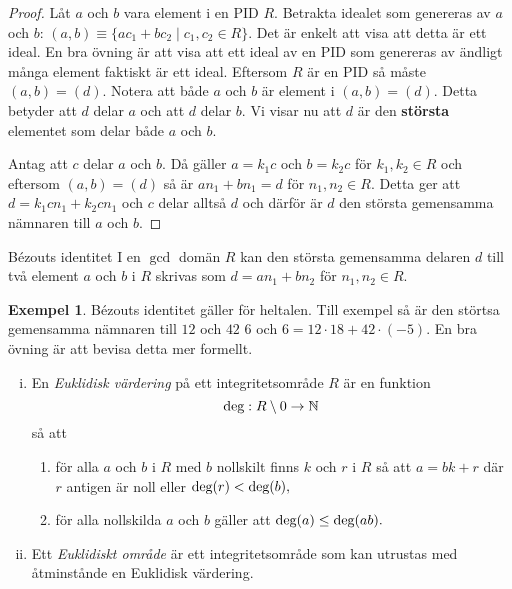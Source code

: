 \documentclass{article}
\newcommand{\grad}[0]{\textnormal{deg}}
\theoremstyle{definition}
\newtheorem{exmp}[thm]{Exempel}
\begin{document}
\begin{proof}
  Låt $a$ och $b$ vara element i en PID $R$. Betrakta idealet som genereras av $a$ och $b$: $(a, b) \equiv \{ ac_1 + bc_2 \; | \; c_1, c_2 \in R \}$.
  Det är enkelt att visa att detta är ett ideal. En bra övning är att visa att ett ideal av en PID som genereras av ändligt många element faktiskt 
  är ett ideal. Eftersom $R$ är en PID så måste $(a, b) = (d)$. Notera att både $a$ och $b$ är element i $(a, b) = (d)$. Detta betyder att 
  $d$ delar $a$ och att $d$ delar $b$. Vi visar nu att $d$ är den \textbf{största} elementet som delar både $a$ och $b$. 

  Antag att $c$ delar $a$ och $b$. Då gäller $a = k_1c$ och $b = k_2c$ för $k_1, k_2 \in R$ och eftersom $(a, b) = (d)$ så är $an_1 + bn_1 = d$
  för $n_1, n_2 \in R$. Detta ger att $d = k_1cn_1 + k_2cn_1$ och $c$ delar alltså $d$ och därför är $d$ den största gemensamma nämnaren till $a$ och $b$.
\end{proof}

\hypertarget{Bézouts identitet}{}
\begin{mykol}{Bézouts identitet}{}
  I en $\gcd$ domän $R$ kan den största gemensamma delaren $d$ till två element $a$ och $b$ i $R$ skrivas som $d = an_1 + bn_2$
  för $n_1, n_2 \in R.$
\end{mykol}
\begin{exmp}
  Bézouts identitet gäller för heltalen. Till exempel så är den störtsa gemensamma nämnaren till $12$ och $42$ $6$ och 
  $6 = 12 \cdot 18 + 42 \cdot (-5).$ En bra övning är att bevisa detta mer formellt. 
\end{exmp}

\begin{mydef}{}{}
  \begin{enumerate}[(i)]
    \item En \textit{Euklidisk värdering} på ett integritetsområde $R$ är en funktion 
    \[ \grad: R \setminus 0 \rightarrow \mathbb{N} \]
    så att 
    \begin{enumerate}
      \item för alla $a$ och $b$ i $R$ med $b$ nollskilt finns $k$ och $r$ i $R$ så att $a = bk + r$ där $r$ antigen är noll eller $\grad (r) < \grad (b),$
      \item för alla nollskilda $a$ och $b$ gäller att $\grad (a) \leq \grad (ab).$
    \end{enumerate}
    \item Ett \textit{Euklidiskt område} är ett integritetsområde som kan utrustas med åtminstånde en Euklidisk värdering.
  \end{enumerate}
\end{mydef}
\end{document}

